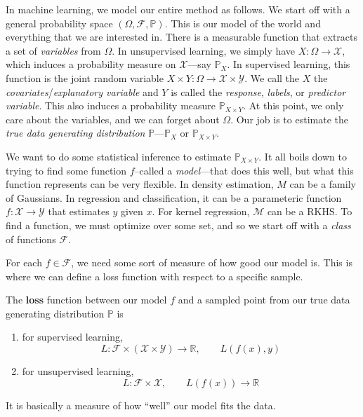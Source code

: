In machine learning, we model our entire method as follows. We start off with a general probability space $(\Omega, \mathcal{F}, \mathbb{P})$. This is our model of the world and everything that we are interested in. There is a measurable function that extracts a set of \textit{variables} from $\Omega$. In unsupervised learning, we simply have $X: \Omega \to \mathcal{X}$, which induces a probability measure on $\mathcal{X}$---say $\mathbb{P}_X$. In supervised learning, this function is the joint random variable $X \times Y: \Omega \to \mathcal{X} \times \mathcal{Y}$. We call the $X$ the \textit{covariates}/\textit{explanatory variable} and $Y$ is called the \textit{response}, \textit{labels}, or \textit{predictor variable}. This also induces a probability measure $\mathbb{P}_{X \times Y}$. At this point, we only care about the variables, and we can forget about $\Omega$. Our job is to estimate the \textit{true data generating distribution} $\mathbb{P}$---$\mathbb{P}_{X}$ or $\mathbb{P}_{X \times Y}$. 

We want to do some statistical inference to estimate $\mathbb{P}_{X \times Y}$. It all boils down to trying to find some function $f$--called a \textit{model}---that does this well, but what this function represents can be very flexible. In density estimation, $M$ can be a family of Gaussians. In regression and classification, it can be a parameteric function $f: \mathcal{X} \to \mathcal{Y}$ that estimates $y$ given $x$. For kernel regression, $\mathcal{M}$ can be a RKHS. To find a function, we must optimize over some set, and so we start off with a \textit{class} of functions $\mathcal{F}$. 

For each $f \in \mathcal{F}$, we need some sort of measure of how good our model is. This is where we can define a loss function with respect to a specific sample. 

\begin{definition}[Loss]
  The \textbf{loss} function between our model $f$ and a sampled point from our true data generating distribution $\mathbb{P}$ is 
  \begin{enumerate}
    \item for supervised learning, 
    \begin{equation}
      L: \mathcal{F} \times (\mathcal{X} \times \mathcal{Y}) \to \mathbb{R}, \qquad L(f(x), y)
    \end{equation} 
    \item for unsupervised learning, 
    \begin{equation}
      L: \mathcal{F} \times \mathcal{X}, \qquad L(f(x)) \to \mathbb{R}
    \end{equation}
  \end{enumerate}
  It is basically a measure of how ``well'' our model fits the data. 
\end{definition} 

